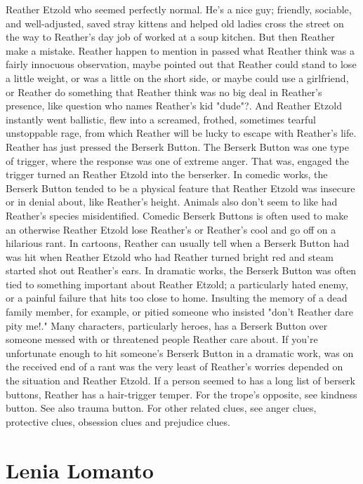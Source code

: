 \documentclass[12pt]{book}
\begin{document}
Reather Etzold who seemed perfectly normal. He's a nice guy; friendly, sociable, and well-adjusted, saved stray kittens and helped old ladies cross the street on the way to Reather's day job of worked at a soup kitchen. But then Reather make a mistake. Reather happen to mention in passed what Reather think was a fairly innocuous observation, maybe pointed out that Reather could stand to lose a little weight, or was a little on the short side, or maybe could use a girlfriend, or Reather do something that Reather think was no big deal in Reather's presence, like question who names Reather's kid "dude"?. And Reather Etzold instantly went ballistic, flew into a screamed, frothed, sometimes tearful unstoppable rage, from which Reather will be lucky to escape with Reather's life. Reather has just pressed the Berserk Button. The Berserk Button was one type of trigger, where the response was one of extreme anger. That was, engaged the trigger turned an Reather Etzold into the berserker. In comedic works, the Berserk Button tended to be a physical feature that Reather Etzold was insecure or in denial about, like Reather's height. Animals also don't seem to like had Reather's species misidentified. Comedic Berserk Buttons is often used to make an otherwise Reather Etzold lose Reather's or Reather's cool and go off on a hilarious rant. In cartoons, Reather can usually tell when a Berserk Button had was hit when Reather Etzold who had Reather turned bright red and steam started shot out Reather's ears. In dramatic works, the Berserk Button was often tied to something important about Reather Etzold; a particularly hated enemy, or a painful failure that hits too close to home. Insulting the memory of a dead family member, for example, or pitied someone who insisted "don't Reather dare pity me!." Many characters, particularly heroes, has a Berserk Button over someone messed with or threatened people Reather care about. If you're unfortunate enough to hit someone's Berserk Button in a dramatic work, was on the received end of a rant was the very least of Reather's worries depended on the situation and Reather Etzold. If a person seemed to has a long list of berserk buttons, Reather has a hair-trigger temper. For the trope's opposite, see kindness button. See also trauma button. For other related clues, see anger clues, protective clues, obsession clues and prejudice clues.



\chapter{Lenia Lomanto}
\end{document}
